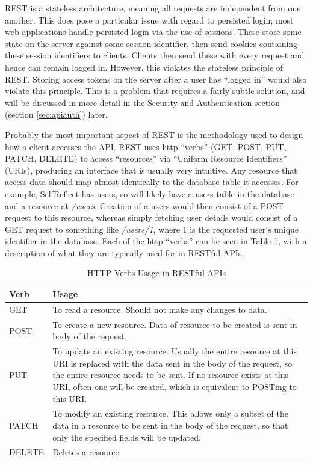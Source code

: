 \documentclass[11pt,openright,a4paper]{report}
\begin{document}
REST is a stateless architecture, meaning all requests are independent from one another. This does pose a particular issue with regard to persisted login; most web applications handle persisted login via the use of sessions. These store some state on the server against some session identifier, then send cookies containing these session identifiers to clients. Clients then send these with every request and hence can remain logged in. However, this violates the stateless principle of REST. Storing access tokens on the server after a user has \enquote{logged in} would also violate this principle. This is a problem that requires a fairly subtle solution, and will be discussed in more detail in the Security and Authentication section (section \ref{sec:apiauth}) later.

Probably the most important aspect of REST is the methodology used to design how a client accesses the API. REST uses http \enquote{verbs} (GET, POST, PUT, PATCH, DELETE) \parencite{httpmethods} to access \enquote{resources} via \enquote{Uniform Resource Identifiers} (URIs), producing an interface that is usually very intuitive. Any resource that access data should map almost identically to the database table it accesses. For example, SelfReflect has users, so will likely have a users table in the database and a resource at \emph{/users}. Creation of a users would then consist of a POST request to this resource, whereas simply fetching user details would consist of a GET request to something like \emph{/users/1}, where 1 is the requested user's unique identifier in the database. Each of the http \enquote{verbs} can be seen in Table \ref{table:httpverbs}, with a description of what they are typically used for in RESTful APIs.

\begin{table}[ht]
\centering
\caption{HTTP Verbs Usage in RESTful APIs}
\label{table:httpverbs}
\begin{tabular}{|p{2cm}|p{12cm}|}
\hline
\textbf{Verb} & \textbf{Usage} \\ \hline
GET &  To read a resource. Should not make any changes to data.  \\  \hline
POST & To create a new resource. Data of resource to be created is sent in body of the request.\\  \hline
PUT &  To update an existing resource. Usually the entire resource at this URI is replaced with the data sent in the body of the request, so the entire resource needs to be sent. If no resource exists at this URI, often one will be created, which is equivalent to POSTing to this URI.\\  \hline
PATCH & To modify an existing resource. This allows only a subset of the data in a resource to be sent in the body of the request, so that only the specified fields will be updated.\\  \hline
DELETE & Deletes a resource. \\  \hline
\end{tabular}
\end{table}
\end{document}
